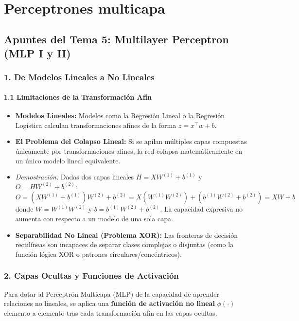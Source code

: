 \chapter{Perceptrones multicapa}
\section{Apuntes del Tema 5: Multilayer Perceptron (MLP I y II)}

\subsection{1. De Modelos Lineales a No Lineales}

\subsubsection{1.1 Limitaciones de la Transformación Afín}

\begin{itemize}
	\item \textbf{Modelos Lineales:} Modelos como la Regresión Lineal o la Regresión Logística calculan transformaciones afines de la forma $z = x^\top w + b$.
	
	\item \textbf{El Problema del Colapso Lineal:} Si se apilan múltiples capas compuestas únicamente por transformaciones afines, la red colapsa matemáticamente en un único modelo lineal equivalente.
	
	\item \emph{Demostración:} Dadas dos capas lineales $H = X W^{(1)} + b^{(1)}$ y $O = H W^{(2)} + b^{(2)}$:
	$$O = (X W^{(1)} + b^{(1)}) W^{(2)} + b^{(2)} = X (W^{(1)} W^{(2)}) + (b^{(1)} W^{(2)} + b^{(2)}) = X W + b$$
	donde $W = W^{(1)} W^{(2)}$ y $b = b^{(1)} W^{(2)} + b^{(2)}$. La capacidad expresiva no aumenta con respecto a un modelo de una sola capa.
	
	\item \textbf{Separabilidad No Lineal (Problema XOR):} Las fronteras de decisión rectilíneas son incapaces de separar clases complejas o disjuntas (como la función lógica XOR o patrones circulares/concéntricos).
\end{itemize}

\subsection{2. Capas Ocultas y Funciones de Activación}

Para dotar al Perceptrón Multicapa (MLP) de la capacidad de aprender relaciones no lineales, se aplica una \textbf{función de activación no lineal} $\phi(\cdot)$ elemento a elemento tras cada transformación afín en las capas ocultas.

